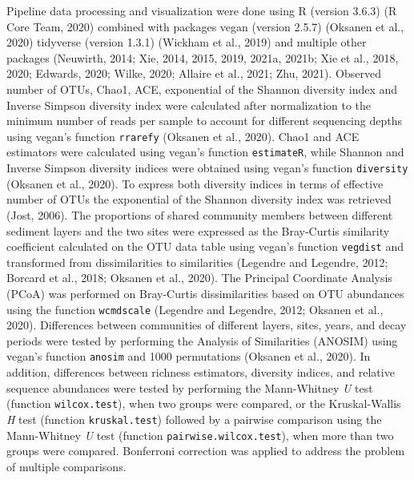 \documentclass[12pt,]{article}
\begin{document}
Pipeline data processing and visualization were done using R (version
3.6.3) (R Core Team, 2020) combined with packages vegan (version 2.5.7)
(Oksanen et al., 2020) tidyverse (version 1.3.1) (Wickham et al., 2019)
and multiple other packages (Neuwirth, 2014; Xie, 2014, 2015, 2019,
2021a, 2021b; Xie et al., 2018, 2020; Edwards, 2020; Wilke, 2020;
Allaire et al., 2021; Zhu, 2021). Observed number of OTUs, Chao1, ACE,
exponential of the Shannon diversity index and Inverse Simpson diversity
index were calculated after normalization to the minimum number of reads
per sample to account for different sequencing depths using vegan's
function \texttt{rrarefy} (Oksanen et al., 2020). Chao1 and ACE
estimators were calculated using vegan's function \texttt{estimateR},
while Shannon and Inverse Simpson diversity indices were obtained using
vegan's function \texttt{diversity} (Oksanen et al., 2020). To express
both diversity indices in terms of effective number of OTUs the
exponential of the Shannon diversity index was retrieved (Jost, 2006).
The proportions of shared community members between different sediment
layers and the two sites were expressed as the Bray-Curtis similarity
coefficient calculated on the OTU data table using vegan's function
\texttt{vegdist} and transformed from dissimilarities to similarities
(Legendre and Legendre, 2012; Borcard et al., 2018; Oksanen et al.,
2020). The Principal Coordinate Analysis (PCoA) was performed on
Bray-Curtis dissimilarities based on OTU abundances using the function
\texttt{wcmdscale} (Legendre and Legendre, 2012; Oksanen et al., 2020).
Differences between communities of different layers, sites, years, and
decay periods were tested by performing the Analysis of Similarities
(ANOSIM) using vegan's function \texttt{anosim} and 1000 permutations
(Oksanen et al., 2020). In addition, differences between richness
estimators, diversity indices, and relative sequence abundances were
tested by performing the Mann-Whitney \emph{U} test (function
\texttt{wilcox.test}), when two groups were compared, or the
Kruskal-Wallis \emph{H} test (function \texttt{kruskal.test}) followed
by a pairwise comparison using the Mann-Whitney \emph{U} test (function
\texttt{pairwise.wilcox.test}), when more than two groups were compared.
Bonferroni correction was applied to address the problem of multiple
comparisons.
\end{document}
